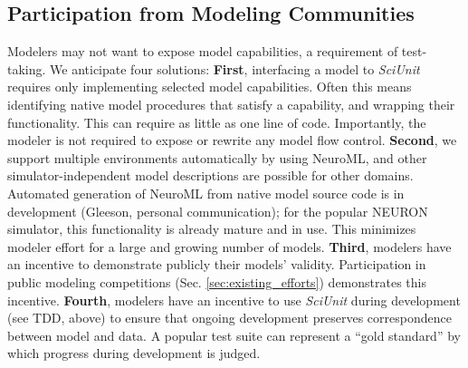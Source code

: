 \documentclass[11pt,letterpaper]{article}
\begin{document}
\subsection{Participation from Modeling Communities}
Modelers may not want to expose model capabilities, a requirement of test-taking.  
We anticipate four solutions: \textbf{First}, interfacing a model to \textit{SciUnit} requires only implementing selected model capabilities. 
Often this means identifying native model procedures that satisfy a capability, and wrapping their functionality. 
This can require as little as one line of code. 
Importantly, the modeler is not required to expose or rewrite any model flow control. 
\textbf{Second}, we support multiple environments automatically by using NeuroML\cite{gleeson_neuroml:_2010}, and other simulator-independent model descriptions are possible for other domains. 
Automated generation of NeuroML from native model source code is in development (Gleeson, personal communication); for the popular NEURON simulator\cite{neuron_url}, this functionality is already mature and in use. 
This minimizes modeler effort for a large and growing number of models. 
\textbf{Third}, modelers have an incentive to demonstrate publicly their models' validity. 
Participation in public modeling competitions (Sec. \ref{sec:existing_efforts}) demonstrates this incentive. 
\textbf{Fourth}, modelers have an incentive to use \textit{SciUnit} during development (see TDD, above) to ensure that ongoing development preserves correspondence between model and data. 
A popular test suite can represent a ``gold standard'' by which progress during development is judged.
\end{document}
